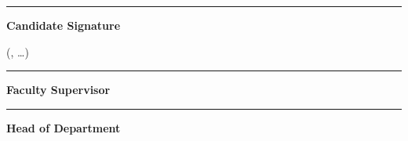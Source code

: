 \vfill
\noindent
\begin{minipage}[t]{0.31\textwidth}
	\centering
	\rule{0.9\linewidth}{0.4pt}\par\vspace{3pt}
	\textbf{Candidate Signature}\par
	{\small (\printStuNameA, \dots)}
\end{minipage}\hfill
\begin{minipage}[t]{0.31\textwidth}
	\centering
	\rule{0.9\linewidth}{0.4pt}\par\vspace{3pt}
	\textbf{Faculty Supervisor}\par
	{\small \printGuideNameA}
\end{minipage}\hfill
\begin{minipage}[t]{0.31\textwidth}
	\centering
	\rule{0.9\linewidth}{0.4pt}\par\vspace{3pt}
	\textbf{Head of Department}\par
	{\small \printHOD}
\end{minipage}
\vspace*{0.2cm}
\thispagestyle{empty}


